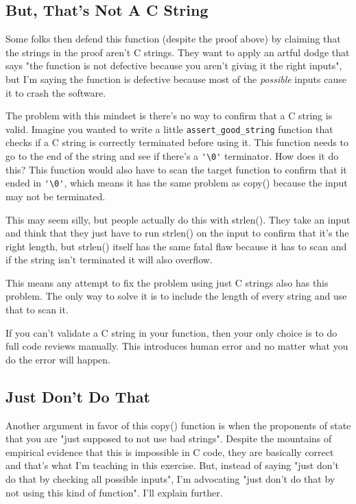 \subsection{But, That's Not A C String}

Some folks then defend this function (despite the proof above) by claiming that the 
strings in the proof aren't C strings.  They want to apply an artful dodge that says
"the function is not defective because you aren't giving it the right inputs", but 
I'm saying the function is defective because most of the \emph{possible} inputs
cause it to crash the software.

The problem with this mindset is there's no way to confirm that a C string is
valid.  Imagine you wanted to write a little \verb|assert_good_string| function
that checks if a C string is correctly terminated before using it.  This function
needs to go to the end of the string and see if there's a \verb|'\0'| terminator.
How does it do this?  This function would also have to scan the target function
to confirm that it ended in \verb|'\0'|, which means it has the same problem
as copy() because the input may not be terminated.

This may seem silly, but people actually do this with strlen().  They take an
input and think that they just have to run strlen() on the input to confirm
that it's the right length, but strlen() itself has the same fatal flaw because
it has to scan and if the string isn't terminated it will also overflow.

This means any attempt to fix the problem using just C strings also has this problem.
The only way to solve it is to include the length of every string and use that
to scan it.

If you can't validate a C string in your function, then your only choice is to
do full code reviews manually.  This introduces human error and no matter what
you do the error will happen.  


\subsection{Just Don't Do That}

Another argument in favor of this copy() function is when the proponents
of \krc state that you are "just supposed to not use bad strings".  Despite
the mountains of empirical evidence that this is impossible in C code, they
are basically correct and that's what I'm teaching in this exercise.  But,
instead of saying "just don't do that by checking all possible inputs", I'm
advocating "just don't do that by not using this kind of function".  I'll
explain further.


